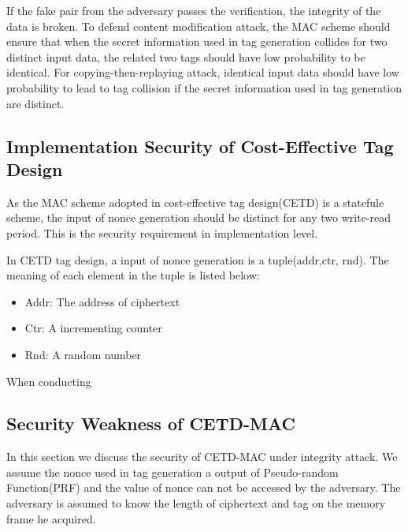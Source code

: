 \documentclass{article}
\begin{document}
If the fake pair from the adversary passes the verification, the integrity of the data is broken. To defend content modification attack, the MAC scheme should ensure that when the secret information used in tag generation collides for two distinct input data, the related two tags should have low probability to be identical. For copying-then-replaying attack, identical input data should have low probability to lead to tag collision if the secret information used in tag generation are distinct. 

\subsection{Implementation Security of Cost-Effective Tag Design}
As the MAC scheme adopted in cost-effective tag design(CETD) is a statefule scheme, the input of nonce generation should be distinct for any two write-read period. This is the security requirement in implementation level. 

In CETD tag design, a input of nonce generation is a tuple(addr,ctr, rnd). The meaning of each element in the tuple is listed below: 
\begin{itemize}
	\item Addr: The address of ciphertext
	\item Ctr: A incrementing counter 
	\item Rnd: A random number
\end{itemize}
When conducting 
\subsection{Security Weakness of CETD-MAC}
In this section we discuss the security of CETD-MAC under integrity attack. We assume the nonce used in tag generation a output of Pseudo-random Function(PRF) and the value of nonce can not be accessed by the adversary. The adversary is assumed to know the length of ciphertext and tag on the memory frame he acquired. 
\end{document}

